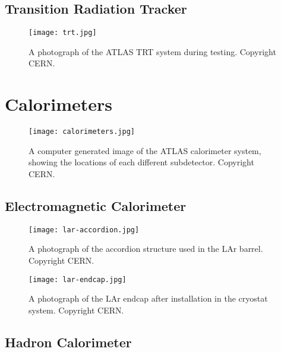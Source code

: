 
\subsection{Transition Radiation Tracker}


\begin{figure}
\centering
\texttt{[image: trt.jpg]}
\label{fig:detector:trt}
\caption{A photograph of the ATLAS TRT system during testing. Copyright CERN.}
\end{figure}


\section{Calorimeters}


\begin{figure}
\centering
\texttt{[image: calorimeters.jpg]}
\label{fig:detector:trt}
\caption{A computer generated image of the ATLAS calorimeter system, showing the locations of each different subdetector. Copyright CERN.}
\end{figure}



\subsection{Electromagnetic Calorimeter}


\begin{figure}
\centering
\texttt{[image: lar-accordion.jpg]}
\label{fig:detector:trt}
\caption{A photograph of the accordion structure used in the LAr barrel. Copyright CERN.}
\end{figure}



\begin{figure}
\centering
\texttt{[image: lar-endcap.jpg]}
\label{fig:detector:trt}
\caption{A photograph of the LAr endcap after installation in the cryostat system. Copyright CERN.}
\end{figure}


\subsection{Hadron Calorimeter}

